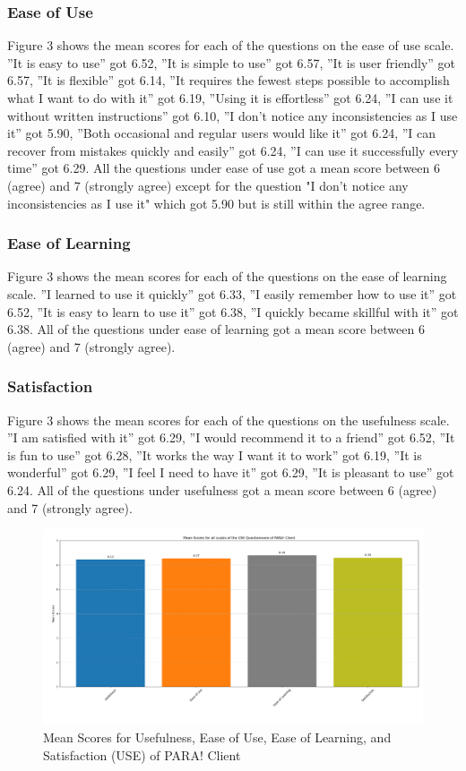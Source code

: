 \documentclass[journal]{./IEEE/IEEEtran}
\begin{document}
\subsubsection{Ease of Use}
Figure 3 shows the mean scores for each of the questions on the ease of use scale. ”It is easy to use” got 6.52, ”It is simple to use” got 6.57, ”It is user friendly” got 6.57, ”It is flexible” got 6.14, ”It requires the fewest steps possible to accomplish what I want to do with it” got 6.19, ”Using it is effortless” got 6.24, ”I can use it without written instructions” got 6.10, ”I don’t notice any inconsistencies as I use it” got 5.90, ”Both occasional and regular users would like it” got 6.24, ”I can recover from mistakes quickly and easily” got 6.24, ”I can use it successfully every time” got 6.29.
All the questions under ease of use got a mean score between 6 (agree) and 7 (strongly agree) except for the question "I don't notice any inconsistencies as I use it" which got 5.90 but is still within the agree range.
\subsubsection{Ease of Learning}
Figure 3 shows the mean scores for each of the questions on the ease of learning scale. ”I learned to use it quickly” got 6.33, ”I easily remember how to use it” got 6.52, ”It is easy to learn to use it” got 6.38, ”I quickly became skillful with it” got 6.38.
All of the questions under ease of learning got a mean score between 6 (agree) and 7 (strongly agree).
\subsubsection{Satisfaction}
Figure 3 shows the mean scores for each of the questions on the usefulness scale. ”I am satisfied with it” got 6.29, ”I would recommend it to a friend” got 6.52, ”It is fun to use” got 6.28, ”It works the way I want it to work” got 6.19, ”It is wonderful” got 6.29, ”I feel I need to have it” got 6.29, ”It is pleasant to use” got 6.24.
All of the questions under usefulness got a mean score between 6 (agree) and 7 (strongly agree).
\begin{figure}[h]
    \centering
        \includegraphics[scale=0.18]{./figures/client means total.png}
    \caption{Mean Scores for Usefulness, Ease of Use, Ease of Learning, and Satisfaction (USE) of PARA! Client}
\end{figure}
\end{document}

